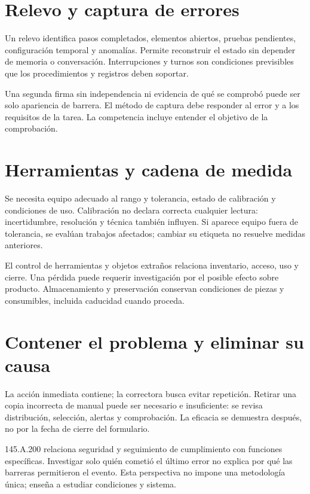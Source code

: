 
\section{Relevo y captura de errores}
Un relevo identifica pasos completados, elementos abiertos, pruebas pendientes, configuración temporal y anomalías. Permite reconstruir el estado sin depender de memoria o conversación. Interrupciones y turnos son condiciones previsibles que los procedimientos y registros deben soportar.

Una segunda firma sin independencia ni evidencia de qué se comprobó puede ser solo apariencia de barrera. El método de captura debe responder al error y a los requisitos de la tarea. La competencia incluye entender el objetivo de la comprobación.
\section{Herramientas y cadena de medida}
Se necesita equipo adecuado al rango y tolerancia, estado de calibración y condiciones de uso. Calibración no declara correcta cualquier lectura: incertidumbre, resolución y técnica también influyen. Si aparece equipo fuera de tolerancia, se evalúan trabajos afectados; cambiar su etiqueta no resuelve medidas anteriores.

El control de herramientas y objetos extraños relaciona inventario, acceso, uso y cierre. Una pérdida puede requerir investigación por el posible efecto sobre producto. Almacenamiento y preservación conservan condiciones de piezas y consumibles, incluida caducidad cuando proceda.
\section{Contener el problema y eliminar su causa}
La acción inmediata contiene; la correctora busca evitar repetición. Retirar una copia incorrecta de manual puede ser necesario e insuficiente: se revisa distribución, selección, alertas y comprobación. La eficacia se demuestra después, no por la fecha de cierre del formulario.

145.A.200 relaciona seguridad y seguimiento de cumplimiento con funciones específicas. Investigar solo quién cometió el último error no explica por qué las barreras permitieron el evento. Esta perspectiva no impone una metodología única; enseña a estudiar condiciones y sistema.
